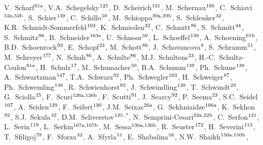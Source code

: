 \begin{flushleft}
V.~Scharf$^\textrm{\scriptsize 61a}$,
V.A.~Schegelsky$^\textrm{\scriptsize 125}$,
D.~Scheirich$^\textrm{\scriptsize 131}$,
M.~Schernau$^\textrm{\scriptsize 166}$,
C.~Schiavi$^\textrm{\scriptsize 52a,52b}$,
S.~Schier$^\textrm{\scriptsize 139}$,
C.~Schillo$^\textrm{\scriptsize 50}$,
M.~Schioppa$^\textrm{\scriptsize 39a,39b}$,
S.~Schlenker$^\textrm{\scriptsize 32}$,
K.R.~Schmidt-Sommerfeld$^\textrm{\scriptsize 103}$,
K.~Schmieden$^\textrm{\scriptsize 32}$,
C.~Schmitt$^\textrm{\scriptsize 86}$,
S.~Schmitt$^\textrm{\scriptsize 44}$,
S.~Schmitz$^\textrm{\scriptsize 86}$,
B.~Schneider$^\textrm{\scriptsize 163a}$,
U.~Schnoor$^\textrm{\scriptsize 50}$,
L.~Schoeffel$^\textrm{\scriptsize 138}$,
A.~Schoening$^\textrm{\scriptsize 61b}$,
B.D.~Schoenrock$^\textrm{\scriptsize 93}$,
E.~Schopf$^\textrm{\scriptsize 23}$,
M.~Schott$^\textrm{\scriptsize 86}$,
J.~Schovancova$^\textrm{\scriptsize 8}$,
S.~Schramm$^\textrm{\scriptsize 51}$,
M.~Schreyer$^\textrm{\scriptsize 177}$,
N.~Schuh$^\textrm{\scriptsize 86}$,
A.~Schulte$^\textrm{\scriptsize 86}$,
M.J.~Schultens$^\textrm{\scriptsize 23}$,
H.-C.~Schultz-Coulon$^\textrm{\scriptsize 61a}$,
H.~Schulz$^\textrm{\scriptsize 17}$,
M.~Schumacher$^\textrm{\scriptsize 50}$,
B.A.~Schumm$^\textrm{\scriptsize 139}$,
Ph.~Schune$^\textrm{\scriptsize 138}$,
A.~Schwartzman$^\textrm{\scriptsize 147}$,
T.A.~Schwarz$^\textrm{\scriptsize 92}$,
Ph.~Schwegler$^\textrm{\scriptsize 103}$,
H.~Schweiger$^\textrm{\scriptsize 87}$,
Ph.~Schwemling$^\textrm{\scriptsize 138}$,
R.~Schwienhorst$^\textrm{\scriptsize 93}$,
J.~Schwindling$^\textrm{\scriptsize 138}$,
T.~Schwindt$^\textrm{\scriptsize 23}$,
G.~Sciolla$^\textrm{\scriptsize 25}$,
F.~Scuri$^\textrm{\scriptsize 126a,126b}$,
F.~Scutti$^\textrm{\scriptsize 91}$,
J.~Searcy$^\textrm{\scriptsize 92}$,
P.~Seema$^\textrm{\scriptsize 23}$,
S.C.~Seidel$^\textrm{\scriptsize 107}$,
A.~Seiden$^\textrm{\scriptsize 139}$,
F.~Seifert$^\textrm{\scriptsize 130}$,
J.M.~Seixas$^\textrm{\scriptsize 26a}$,
G.~Sekhniaidze$^\textrm{\scriptsize 106a}$,
K.~Sekhon$^\textrm{\scriptsize 92}$,
S.J.~Sekula$^\textrm{\scriptsize 42}$,
D.M.~Seliverstov$^\textrm{\scriptsize 125}$$^{,*}$,
N.~Semprini-Cesari$^\textrm{\scriptsize 22a,22b}$,
C.~Serfon$^\textrm{\scriptsize 121}$,
L.~Serin$^\textrm{\scriptsize 119}$,
L.~Serkin$^\textrm{\scriptsize 167a,167b}$,
M.~Sessa$^\textrm{\scriptsize 136a,136b}$,
R.~Seuster$^\textrm{\scriptsize 172}$,
H.~Severini$^\textrm{\scriptsize 115}$,
T.~Sfiligoj$^\textrm{\scriptsize 78}$,
F.~Sforza$^\textrm{\scriptsize 32}$,
A.~Sfyrla$^\textrm{\scriptsize 51}$,
E.~Shabalina$^\textrm{\scriptsize 56}$,
N.W.~Shaikh$^\textrm{\scriptsize 150a,150b}$,
$$
\end{flushleft}
